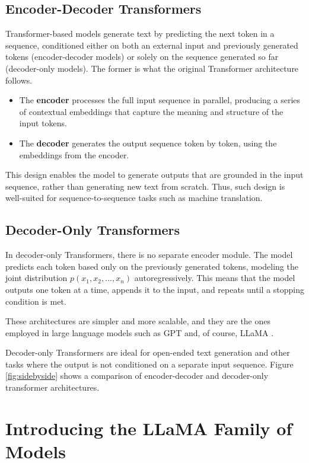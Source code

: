 \subsection{Encoder-Decoder Transformers}

Transformer-based models generate text by predicting the next token in a sequence, conditioned either on both an external input and previously generated tokens (encoder-decoder models) or solely on the sequence generated so far (decoder-only models). The former is what the original Transformer architecture~\cite{attention_is_all_you_need} follows.

\begin{itemize}
  \item The \textbf{encoder} processes the full input sequence in parallel, producing a series of contextual embeddings that capture the meaning and structure of the input tokens.
  \item The \textbf{decoder} generates the output sequence token by token, using the embeddings from the encoder.
\end{itemize}

This design enables the model to generate outputs that are grounded in the input sequence, rather than generating new text from scratch. Thus, such design is well-suited for sequence-to-sequence tasks such as machine translation.

\subsection{Decoder-Only Transformers}

In decoder-only Transformers, there is no separate encoder module. The model predicts each token based only on the previously generated tokens, modeling the joint distribution \( p(x_1, x_2, \ldots, x_n) \) autoregressively. This means that the model outputs one token at a time, appends it to the input, and repeats until a stopping condition is met.

These architectures are simpler and more scalable, and they are the ones employed in large language models such as GPT \cite{gpt} and, of course, LLaMA \cite{llama}.

Decoder-only Transformers are ideal for open-ended text generation and other tasks where the output is not conditioned on a separate input sequence.
Figure \ref{fig:sidebyside} shows a comparison of encoder-decoder and decoder-only transformer architectures.

\section{Introducing the LLaMA Family of Models} \label{llama_overview}

